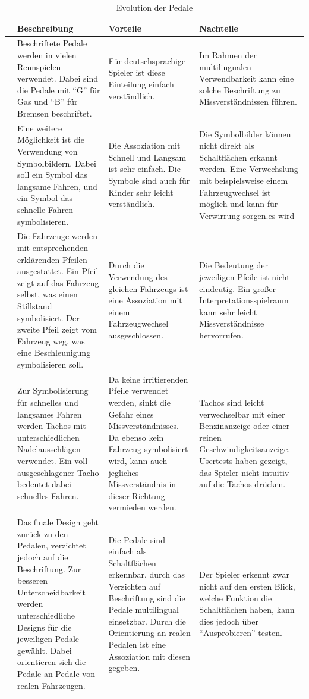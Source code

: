 	\begin{longtable}{cp{3.9cm}p{3.9cm}p{3.9cm}}%
		\toprule \endhead%
		\bottomrule \caption{Evolution der Pedale}\label{gasevo-tabelle} \endlastfoot%
			 & Beschreibung & Vorteile & Nachteile \\ \midrule
			\pedaleSchrift 		& Beschriftete Pedale werden in vielen Rennspielen verwendet. Dabei sind die Pedale mit \enquote{G} für Gas und \enquote{B} für Bremsen beschriftet. & Für deutschsprachige Spieler ist diese Einteilung einfach verständlich. & Im Rahmen der multilingualen Verwendbarkeit kann eine solche Beschriftung zu Missverständnissen führen. \\%
			\symbolbild 		& Eine weitere Möglichkeit ist die Verwendung von Symbolbildern. Dabei soll ein Symbol das langsame Fahren, und ein Symbol das schnelle Fahren symbolisieren. & Die Assoziation mit Schnell und Langsam ist sehr einfach. Die Symbole sind auch für Kinder sehr leicht verständlich. & Die Symbolbilder können nicht direkt als Schaltflächen erkannt werden. Eine Verwechslung mit beispielsweise einem Fahrzeugwechsel ist möglich und kann für Verwirrung sorgen.es wird  \\%
			\autoPfeil 			&  Die Fahrzeuge werden mit entsprechenden erklärenden Pfeilen ausgestattet. Ein Pfeil zeigt auf das Fahrzeug selbst, was einen Stillstand symbolisiert. Der zweite Pfeil zeigt vom Fahrzeug weg, was eine Beschleunigung symbolisieren soll. & Durch die Verwendung des gleichen Fahrzeugs ist eine Assoziation mit einem Fahrzeugwechsel ausgeschlossen. & Die Bedeutung der jeweiligen Pfeile ist nicht eindeutig. Ein großer Interpretationsspielraum kann sehr leicht Missverständnisse hervorrufen. \\%
			\tacho 				& Zur Symbolisierung für schnelles und langsames Fahren werden Tachos mit unterschiedlichen Nadelausschlägen verwendet. Ein voll ausgeschlagener Tacho bedeutet dabei schnelles Fahren. & Da keine irritierenden Pfeile verwendet werden, sinkt die Gefahr eines Missverständnisses. Da ebenso kein Fahrzeug symbolisiert wird, kann auch jegliches Missverständnis in dieser Richtung vermieden werden. & Tachos sind leicht verwechselbar mit einer Benzinanzeige oder einer reinen Geschwindigkeitsanzeige. Usertests haben gezeigt, das Spieler nicht intuitiv auf die Tachos drücken. \\%
			\pedaleRealistisch 	& Das finale Design geht zurück zu den Pedalen, verzichtet jedoch auf die Beschriftung. Zur besseren Unterscheidbarkeit werden unterschiedliche Designs für die jeweiligen Pedale gewählt. Dabei orientieren sich die Pedale an Pedale von realen Fahrzeugen. & Die Pedale sind einfach als Schaltflächen erkennbar, durch das Verzichten auf Beschriftung sind die Pedale multilingual einsetzbar. Durch die Orientierung an realen Pedalen ist eine Assoziation mit diesen gegeben. & Der Spieler erkennt zwar nicht auf den ersten Blick, welche Funktion die Schaltflächen haben, kann dies jedoch über \enquote{Ausprobieren} testen. \\%
	\end{longtable}
